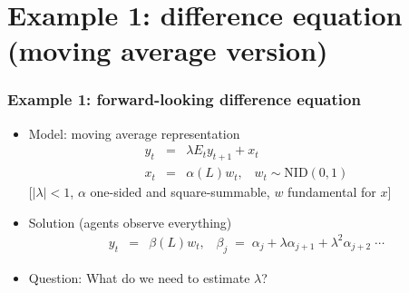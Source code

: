\documentclass{beamer}
\begin{document}
\section{Example 1: difference equation (moving average version)}
\begin{frame}
\frametitle{Example 1:  forward-looking difference equation}
\begin{itemize} \itemsep=\bigskipamount
\item Model:  moving average representation
\begin{eqnarray*}
    y_t &=& \lambda E_t y_{t+1} + x_t \phantom{xxx} \\
    x_t &=& \alpha(L) w_t, \;\;\;   w_t \sim \mbox{NID}(0,1)  %
\end{eqnarray*}
[$|\lambda|<1$, $\alpha$ one-sided and square-summable, $w$ fundamental for $x$]
\item Solution (agents observe everything)
\begin{eqnarray*}
    y_t &=& \beta(L) w_t, \;\;\;
    \beta_j \;=\; \alpha_j + \lambda \alpha_{j+1} + \lambda^2 \alpha_{j+2} \; \cdots
\end{eqnarray*}

\item Question:  What do we need to estimate $\lambda$?
\end{itemize}
\end{frame}
\end{document}
